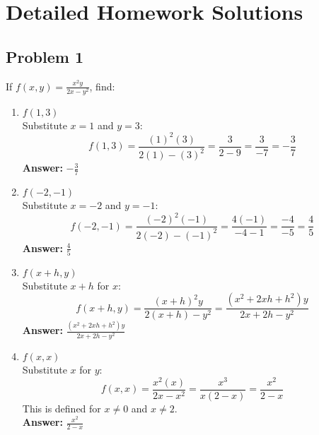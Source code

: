 \documentclass{article}
\begin{document}
\section{Detailed Homework Solutions}

\subsection{Problem 1}
If $f(x, y) = \frac{x^2y}{2x - y^2}$, find:
\begin{enumerate}[label=\alph*.]
    \item \textbf{$f(1, 3)$} \\
    Substitute $x=1$ and $y=3$:
    \[ f(1, 3) = \frac{(1)^2(3)}{2(1) - (3)^2} = \frac{3}{2 - 9} = \frac{3}{-7} = -\frac{3}{7} \]
    \textbf{Answer:} $-\frac{3}{7}$

    \item \textbf{$f(-2, -1)$} \\
    Substitute $x=-2$ and $y=-1$:
    \[ f(-2, -1) = \frac{(-2)^2(-1)}{2(-2) - (-1)^2} = \frac{4(-1)}{-4 - 1} = \frac{-4}{-5} = \frac{4}{5} \]
    \textbf{Answer:} $\frac{4}{5}$

    \item \textbf{$f(x+h, y)$} \\
    Substitute $x+h$ for $x$:
    \[ f(x+h, y) = \frac{(x+h)^2y}{2(x+h) - y^2} = \frac{(x^2 + 2xh + h^2)y}{2x + 2h - y^2} \]
    \textbf{Answer:} $\frac{(x^2 + 2xh + h^2)y}{2x + 2h - y^2}$

    \item \textbf{$f(x, x)$} \\
    Substitute $x$ for $y$:
    \[ f(x, x) = \frac{x^2(x)}{2x - x^2} = \frac{x^3}{x(2 - x)} = \frac{x^2}{2 - x} \]
    This is defined for $x \neq 0$ and $x \neq 2$. \\
    \textbf{Answer:} $\frac{x^2}{2-x}$
\end{enumerate}
\end{document}
